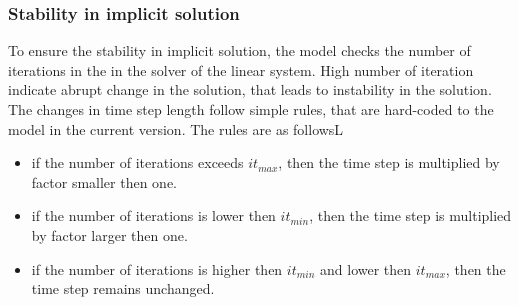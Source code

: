     \subsubsection{Stability in implicit solution}
    To ensure the stability in implicit solution, the model checks the number
    of iterations in the in the solver of the linear system. High number of
    iteration indicate abrupt change in the solution, that leads to instability
    in the solution. The changes in time step length follow simple rules, that
    are hard-coded to the model in the current version. The rules are as
    followsL 
    \begin{itemize}
        \item if the number of iterations exceeds $it_{max}$, then the time step
            is multiplied by factor smaller then one. 
        \item if the number of iterations is lower then $it_{min}$, then the time
            step is multiplied by factor larger then one. 
        \item if the number of iterations is higher then $it_{min}$ and lower
            then $it_{max}$, then the time step remains unchanged. 
    \end{itemize}

